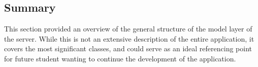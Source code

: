 \subsection{Summary}
This section provided an overview of the general structure of the model layer of the server. While this is not an extensive description of the entire application, it covers the most significant classes, and could serve as an ideal referencing point for future student wanting to continue the development of the application.